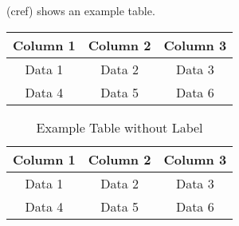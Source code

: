  (cref) shows an example table.

\begin{table}[H]
    \centering
    \begin{tabular}{|c|c|c|}
        \hline
        Column 1 & Column 2 & Column 3 \\
        \hline
        Data 1 & Data 2 & Data 3 \\
        Data 4 & Data 5 & Data 6 \\
        \hline
    \end{tabular}
\end{table}

\begin{table}[H]
    \centering
    \begin{tabular}{|c|c|c|}
        \hline
        Column 1 & Column 2 & Column 3 \\
        \hline
        Data 1 & Data 2 & Data 3 \\
        Data 4 & Data 5 & Data 6 \\
        \hline
    \end{tabular}
    \caption{Example Table without Label}
\end{table}